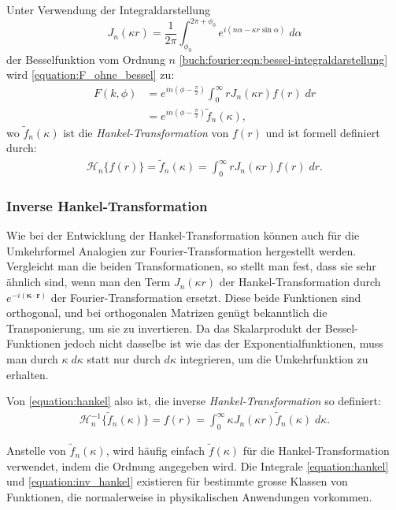 Unter Verwendung der Integraldarstellung
\begin{equation*}
	J_n(\kappa r)=\frac{1}{2\pi}\int_{\phi_{0}}^{2\pi + \phi_{0}}e^{i(n\alpha-\kappa r \sin \alpha)} \; d\alpha
	\label{equation:bessel_n_ordnung}
\end{equation*}
 der Besselfunktion vom Ordnung $n$ \eqref{buch:fourier:eqn:bessel-integraldarstellung} wird \eqref{equation:F_ohne_bessel} zu:
\begin{align}
	F(k,\phi)&=e^{in(\phi-\frac{\pi}{2})}\int_{0}^{\infty}rJ_n(\kappa r) f(r) \; dr  \nonumber \\ 
	&=e^{in(\phi-\frac{\pi}{2})}\tilde{f}_n(\kappa),
	\label{equation:F_mit_bessel_step_2}
\end{align}
wo $\tilde{f}_n(\kappa)$ ist die \textit{Hankel-Transformation} von $f(r)$ und ist formell definiert durch:
\begin{align}
	\mathscr{H}_n\{f(r)\}=\tilde{f}_n(\kappa)=\int_{0}^{\infty}rJ_n(\kappa r) f(r) \; dr.
	\label{equation:hankel}
\end{align}

\subsubsection{Inverse Hankel-Transformation \label{subsub:inverse_hankel_tansformation}}
Wie bei der Entwicklung der Hankel-Transformation können auch für die Umkehrformel Analogien zur Fourier-Transformation hergestellt werden. Vergleicht man die beiden Transformationen, so stellt man fest, dass sie sehr ähnlich sind, wenn man den Term $J_n(\kappa r)$ der Hankel-Transformation durch $e^{-i( \bm{\kappa}\cdot \mathbf{r})}$ der Fourier-Transformation ersetzt. Diese beide Funktionen sind orthogonal, und bei orthogonalen Matrizen genügt bekanntlich die Transponierung, um sie zu invertieren. Da das Skalarprodukt der Bessel-Funktionen jedoch nicht dasselbe ist wie das der Exponentialfunktionen, muss man durch $\kappa\; d\kappa$ statt nur durch $d\kappa$ integrieren, um die Umkehrfunktion zu erhalten.

Von \eqref{equation:hankel} also ist, die inverse \textit{Hankel-Transformation} so definiert:
\begin{align}
	\mathscr{H}^{-1}_n\{\tilde{f}_n(\kappa)\}=f(r)=\int_{0}^{\infty}\kappa J_n(\kappa r) \tilde{f}_n(\kappa) \; d\kappa.
	\label{equation:inv_hankel}
\end{align}

Anstelle von $\tilde{f}_n(\kappa)$, wird häufig einfach $\tilde{f}(\kappa)$ für die Hankel-Transformation verwendet, indem die Ordnung angegeben wird.
Die Integrale \eqref{equation:hankel} und \eqref{equation:inv_hankel} existieren für bestimmte grosse Klassen von Funktionen, die normalerweise in physikalischen Anwendungen vorkommen.

